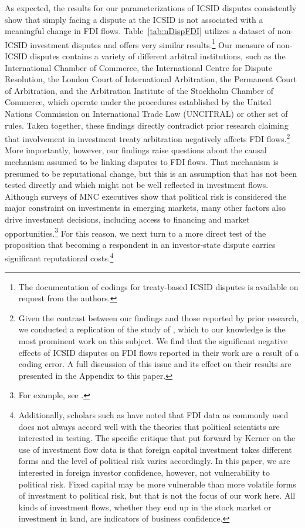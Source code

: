 \documentclass[12pt,onesided]{amsart}
\begin{document}
As expected, the results for our parameterizations of ICSID disputes consistently show that simply facing a dispute at the ICSID is not associated with a meaningful change in FDI flows. Table~\ref{tab:nDispFDI} utilizes a dataset of non-ICSID investment disputes and offers very similar results.\footnote{The documentation of codings for treaty-based ICSID disputes is available on request from the authors.} Our measure of non-ICSID disputes contains a variety of different arbitral institutions, such as the International Chamber of Commerce, the International Centre for Dispute Resolution, the London Court of International Arbitration, the Permanent Court of Arbitration, and the Arbitration Institute of the Stockholm Chamber of Commerce, which operate under the procedures established by the United Nations Commission on International Trade Law (UNCITRAL)  or other set of rules. Taken together, these findings directly contradict prior research claiming that involvement in investment treaty arbitration negatively affects FDI flows.\footnote{Given the contrast between our findings and those reported by prior research, we conducted a replication of the study of \citet{allee:peinhardt:2011}, which to our knowledge is the most prominent work on this subject. We find that the significant negative effects of ICSID disputes on FDI flows reported in their work are a result of a coding error. A full discussion of this issue and its effect on their results are presented in the Appendix to this paper.} More importantly, however, our findings raise questions about the causal mechanism assumed to be linking disputes to FDI flows. That mechanism is presumed to be reputational change, but this is an assumption that has not been tested directly and which might not  be well reflected in investment flows. Although surveys of MNC executives show that political risk is considered the major constraint on investments in emerging markets, many other factors also drive investment decisions, including access to financing and market opportunities.\footnote{For example, see \citet{miga:2011}.} For this reason, we next turn to a more direct test of the proposition that becoming a respondent in an investor-state dispute carries significant reputational costs.\footnote{Additionally, scholars such as \citet{kerner2014we,lipsey2005impact} have noted that FDI data as commonly used does not always accord well with the theories that political scientists are interested in testing. The specific critique that put forward by Kerner on the use of investment flow data is that foreign capital investment takes different forms and the level of political risk varies accordingly. In this paper, we are interested in foreign investor confidence, however, not  vulnerability to political risk. Fixed capital may be more vulnerable than more volatile forms of investment to political risk, but that is not the focus of our work here. All kinds of investment flows, whether they end up in the stock market or investment in land, are indicators of business confidence.}
\end{document}
